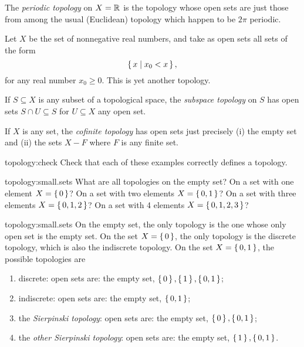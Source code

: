\begin{example}
The \emph{periodic topology} on \(X=\mathbb{R}^{}\) is the topology whose open sets are just those from among the usual (Euclidean) topology which happen to be \(2\pi\) periodic.
\begin{center}

\end{center}
\end{example}
\begin{example}
Let \(X\) be the set of nonnegative real numbers, and take as open sets all sets of the form 
\[
\set{x|x_0 < x},
\]
for any real number \(x_0 \ge 0\).
This is yet another topology.
\end{example}
\begin{example}
If \(S \subseteq X\) is any subset of a topological space, the \emph{subspace topology}%
 on \(S\) has open sets \(S \cap U \subseteq S\) for \(U \subseteq X\) any open set.
\end{example}
\begin{example}
If \(X\) is any set, the \emph{cofinite topology} has open sets just precisely (i) the empty set and (ii) the sets \(X-F\) where \(F\) is any finite set.
\end{example}
\begin{problem}{topology:check}
Check that each of these examples correctly defines a topology.
\end{problem}
\begin{problem}{topology:small.sets}
What are all topologies on the empty set? On a set with one element \(X=\set{0}\)? On a set with two elements \(X=\set{0,1}\)? On a set with three elements \(X=\set{0,1,2}\)? 
On a set with 4 elements \(X=\set{0,1,2,3}\)? 
\end{problem}
\begin{answer}{topology:small.sets}
On the empty set, the only topology is the one whose only open set is the empty set.
On the set \(X=\set{0}\), the only topology is the discrete topology, which is also the indiscrete topology.
On the set \(X=\set{0,1}\), the possible topologies are
\begin{enumerate}
\item discrete: open sets are: the empty set, \(\set{0},\set{1},\set{0,1}\);
\item indiscrete: open sets are: the empty set, \(\set{0,1}\);
\item the \emph{Sierpinski topology}: open sets are: the empty set, \(\set{0}, \set{0,1}\);
\item the \emph{other Sierpinski topology}: open sets are: the empty set, \(\set{1}, \set{0,1}\).
\end{enumerate}
\end{answer}
